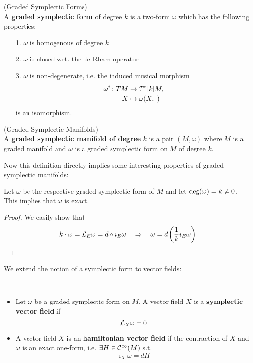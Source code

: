 \begin{definition} (Graded Symplectic Forms)\\
  A \textbf{graded symplectic form} of degree $k$ is a two-form $\omega$ which has the following properties:
  \begin{itemize}
    \item[1.] $\omega$ is homogenous of degree $k$
    \item[2.] $\omega$ is closed wrt. the de Rham operator
    \item[3.] $\omega$ is non-degenerate, i.e. the induced musical morphism
    \begin{align}
      \omega^i : TM &\rightarrow T^*[k]M,\\
      X &\mapsto \omega(X, \cdot)
    \end{align}
    is an isomorphism.
  \end{itemize}
\end{definition}


\begin{definition} (Graded Symplectic Manifolds)\\
  A \textbf{graded symplectic manifold of degree $k$} is a pair $(M, \omega)$ where $M$ is a graded manifold and $\omega$ is a graded symplectic form on $M$ of degree $k$.
\end{definition}

Now this definition directly implies some interesting properties of graded symplectic manifolds:

\begin{lem}
 Let $\omega$ be the respective graded symplectic form of $M$ and let $\operatorname{deg}(\omega) = k \neq 0$. This implies that $\omega$ is exact.

\begin{proof}
  We easily show that
  $$ k \cdot \omega = \mathcal{L}_{E} \omega = d\circ \imath_E\omega \quad \Rightarrow \quad \omega = d\left( \frac{1}{k} \imath_E \omega \right) $$
\end{proof}
\end{lem}

We extend the notion of a symplectic form to vector fields:

\begin{definition}~
\begin{itemize}
  \item Let $\omega$ be a graded symplectic form on $M$. A vector field $X$ is a \textbf{symplectic vector field} if
  $$ \mathcal{L}_{X}\omega = 0 $$

  \item A vector field $X$ is an \textbf{hamiltonian vector field} if the contraction of $X$ and $\omega$ is an exact one-form, i.e. $\exists H \in \mathcal{C}^{\infty}(M)$ s.t.
  $$ \imath_X \omega = dH $$

\end{itemize}
\end{definition}

